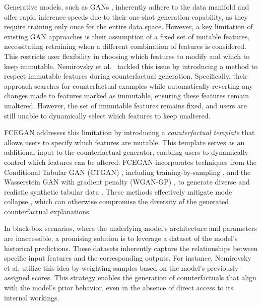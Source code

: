 Generative models, such as GANs \cite{nemirovsky_2022_countergan,vanlooveren_2021_conditional,singla_2021_explaining}, inherently adhere to the data manifold and offer rapid inference speeds due to their one-shot generation capability, as they require training only once for the entire data space. However, a key limitation of existing GAN approaches is their assumption of a fixed set of mutable features, necessitating retraining when a different combination of features is considered. This restricts user flexibility in choosing which features to modify and which to keep immutable. Nemirovsky et al.~\cite{nemirovsky_2022_countergan} tackled this issue by introducing a method to respect immutable features during counterfactual generation. Specifically, their approach searches for counterfactual examples while automatically reverting any changes made to features marked as immutable, ensuring these features remain unaltered. However, the set of immutable features remains fixed, and users are still unable to dynamically select which features to keep unaltered. 

FCEGAN addresses this limitation by introducing a \textit{counterfactual template} that allows users to specify which features are mutable. This template serves as an additional input to the counterfactual generator, enabling users to dynamically control which features can be altered. FCEGAN incorporates techniques from the Conditional Tabular GAN (CTGAN) \cite{xu_modeling_2019}, including training-by-sampling \cite{engelmann_conditional_2021,zhao_ctab-gan_2021}, and the Wasserstein GAN \cite{arjovsky_towards_2017,arjovsky_wasserstein_2017} with gradient penalty (WGAN-GP) \cite{gulrajani_improvedwgan_2017}, to generate diverse and realistic synthetic tabular data \cite{xu_modeling_2019}. These methods effectively mitigate mode collapse \cite{srivastava2017veegan}, which can otherwise compromise the diversity of the generated counterfactual explanations.

In black-box scenarios, where the underlying model's architecture and parameters are inaccessible, a promising solution is to leverage a dataset of the model's historical predictions. These datasets inherently capture the relationships between specific input features and the corresponding outputs. For instance, Nemirovsky et al.\cite{nemirovsky_2022_countergan} utilize this idea by weighting samples based on the model's previously assigned scores. This strategy enables the generation of counterfactuals that align with the model's prior behavior, even in the absence of direct access to its internal workings.

